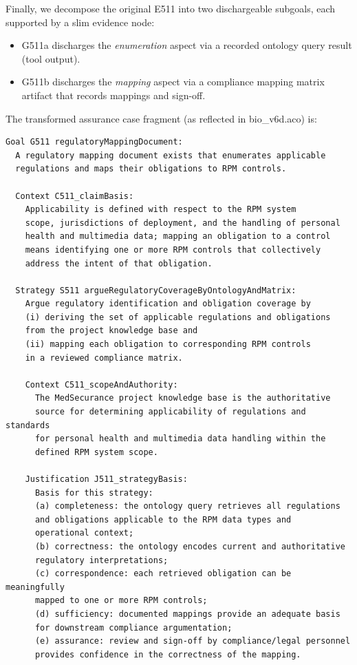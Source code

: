 \documentclass{article}
\begin{document}
Finally, we decompose the original E511 into two dischargeable subgoals, each supported by a slim evidence node:

\begin{itemize}
\item G511a discharges the \emph{enumeration} aspect via a recorded ontology query result (tool output).
\item G511b discharges the \emph{mapping} aspect via a compliance mapping matrix artifact that records mappings and sign-off.
\end{itemize}

The transformed assurance case fragment (as reflected in bio\_v6d.aco) is:

\begin{Verbatim}[commandchars=\\\{\}]
Goal G511 regulatoryMappingDocument:
  A regulatory mapping document exists that enumerates applicable
  regulations and maps their obligations to RPM controls.

  Context C511_claimBasis:
    Applicability is defined with respect to the RPM system
    scope, jurisdictions of deployment, and the handling of personal
    health and multimedia data; mapping an obligation to a control
    means identifying one or more RPM controls that collectively
    address the intent of that obligation.

  Strategy S511 argueRegulatoryCoverageByOntologyAndMatrix:
    Argue regulatory identification and obligation coverage by
    (i) deriving the set of applicable regulations and obligations
    from the project knowledge base and
    (ii) mapping each obligation to corresponding RPM controls
    in a reviewed compliance matrix.

    Context C511_scopeAndAuthority:
      The MedSecurance project knowledge base is the authoritative
      source for determining applicability of regulations and standards
      for personal health and multimedia data handling within the
      defined RPM system scope.

    Justification J511_strategyBasis:
      Basis for this strategy:
      (a) completeness: the ontology query retrieves all regulations
      and obligations applicable to the RPM data types and
      operational context;
      (b) correctness: the ontology encodes current and authoritative
      regulatory interpretations;
      (c) correspondence: each retrieved obligation can be meaningfully
      mapped to one or more RPM controls;
      (d) sufficiency: documented mappings provide an adequate basis
      for downstream compliance argumentation;
      (e) assurance: review and sign-off by compliance/legal personnel
      provides confidence in the correctness of the mapping.


\end{Verbatim}
\end{document}
